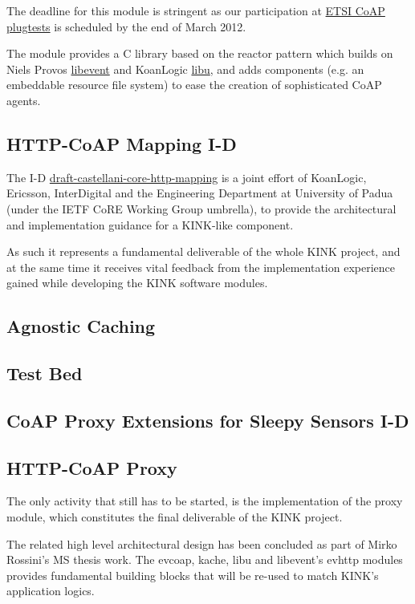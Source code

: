 \documentclass[12pt]{article}
\begin{document}
The deadline for this module is stringent as our participation at \href{http://www.etsi.org/plugtests/coap/coap.htm}{ETSI CoAP plugtests} is scheduled by the end of March 2012.

The module provides a C library based on the reactor pattern which builds on Niels Provos \href{http://libevent.org}{libevent} and KoanLogic \href{http://koanlogic.com/libu}{libu}, and adds components (e.g. an embeddable resource file system) to ease the creation of sophisticated CoAP agents.

\subsection{HTTP-CoAP Mapping I-D}
The I-D \href{http://tools.ietf.org/html/draft-castellani-core-http-mapping}{draft-castellani-core-http-mapping} is a joint effort of \mbox{KoanLogic}, \mbox{Ericsson}, \mbox{InterDigital} and the Engineering Department at University of Padua (under the IETF CoRE Working Group umbrella), to provide the architectural and implementation guidance for a KINK-like component.

As such it represents a fundamental deliverable of the whole KINK project, and at the same time it receives vital feedback from the implementation experience gained while developing the KINK software modules.

\subsection{Agnostic Caching}


\subsection{Test Bed}


\subsection{CoAP Proxy Extensions for Sleepy Sensors I-D}


\subsection{HTTP-CoAP Proxy}
The only activity that still has to be started, is the implementation of the proxy module, which constitutes the final deliverable of the KINK project. 

The related high level architectural design has been concluded as part of Mirko Rossini's MS thesis work.  The evcoap, kache, libu and libevent's evhttp modules provides fundamental building blocks that will be re-used to match KINK's application logics.
\end{document}
